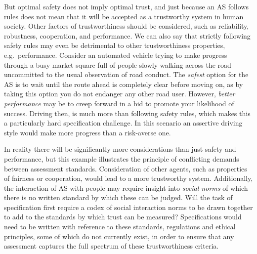 \documentclass[sigconf,nonacm]{acmart}%
\begin{document}
But optimal safety does not imply optimal trust, and just because an AS follows rules does not mean that it will be accepted as a trustworthy system in human society. Other factors of trustworthiness should be considered, such as reliability, robustness, cooperation, and performance. 
%
We can also say that strictly following safety rules may even be detrimental to other trustworthiness properties, e.g.\ performance. 
%
Consider an automated vehicle trying to make progress through a busy market square full of people slowly walking across the road uncommitted to the usual observation of road conduct. 
%
The \emph{safest} option for the AS is to wait until the route ahead is completely clear before moving on, as by taking this option you do not endanger any other road user. However, \emph{better performance} may be to creep forward in a bid to promote your likelihood of success.
%
Driving then, is much more than following safety rules, which makes this a particularly hard specification challenge. In this scenario an assertive driving style would make more progress than a risk-averse one. 
%


In reality there will be significantly more considerations than just safety and performance, but this example illustrates the principle of conflicting demands between assessment standards. 
%
Consideration of other agents, such as properties of fairness or cooperation, would lead to a more trustworthy system. 
%
Additionally, the interaction of AS with people may require insight into \emph{social norms} of which there is no written standard by which these can be judged. Will the task of specification first require a codex of social interaction norms to be drawn together to add to the standards by which trust can be measured? 
%
Specifications would need to be written with reference to these standards, regulations and ethical principles, some of which do not currently exist, in order to ensure that any assessment captures the full spectrum of these trustworthiness criteria. 
\end{document}
